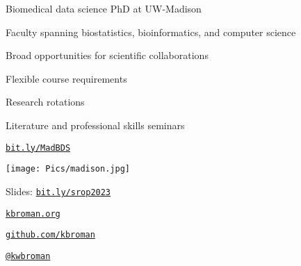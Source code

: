 \documentclass[12pt,t,aspectratio=169]{beamer}
\begin{document}
\begin{frame}{Biomedical data science PhD at UW-Madison}

    \bbi
  \item Faculty spanning biostatistics, bioinformatics, and computer
    science
  \item Broad opportunities for scientific collaborations
  \item Flexible course requirements
  \item Research rotations
  \item Literature and professional skills seminars
    \ei


\bigskip \bigskip

\centerline{\href{https://bit.ly/MadBDS}{\Large \tt bit.ly/MadBDS}}

\end{frame}


\begin{frame}[c]{}

  \vspace{-10mm} \hspace*{-13mm}
  \texttt{[image: Pics/madison.jpg]}

\end{frame}



\begin{frame}[c]{}

\Large

Slides: \href{https://bit.ly/srop2023}{\tt bit.ly/srop2023}

\vspace{7mm}

\href{https://kbroman.org}{\tt \lolit kbroman.org}

\vspace{7mm}

\href{https://github.com/kbroman}{\tt \lolit github.com/kbroman}

\vspace{7mm}

\href{https://twitter.com/kwbroman}{\tt \lolit @kwbroman}


\end{frame}
\end{document}
